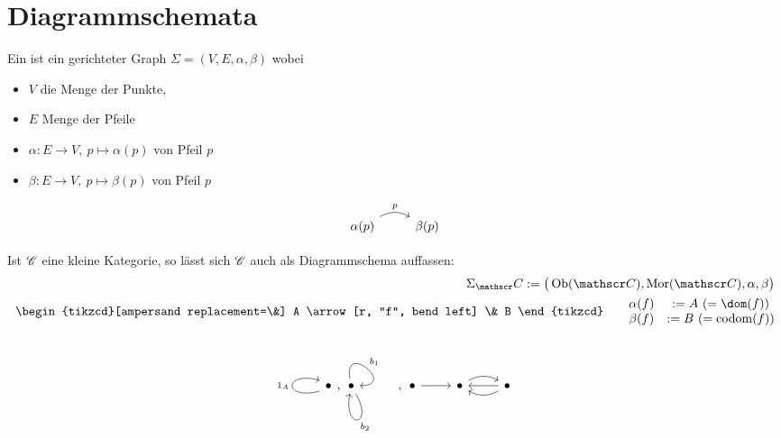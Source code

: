 \section{Diagrammschemata}
\begin{definition}\enter
	Ein  ist ein gerichteter Graph $\Sigma=(V,E,\alpha,\beta)$ wobei 
	\begin{itemize}
		\item $V$ die Menge der Punkte,
		\item $E$ Menge der Pfeile
		\item $\alpha:E\to V,~p\mapsto\alpha(p)$  von Pfeil $p$
		\item $\beta:E\to V,~p\mapsto\beta(p)$  von Pfeil $p$
	\end{itemize}
	$$
	\begin{tikzcd}
\alpha(p) \arrow[r, "p", bend left] & \beta(p)
\end{tikzcd}
$$
\end{definition}
Ist $\mathscr C$ eine kleine Kategorie, so lässt sich $\mathscr C$ auch als Diagrammschema auffassen:
\begin{align*}
	\Sigma_\Cat:=\big(\Ob(\Cat),\Mor(\Cat),\alpha,\beta\big)\\
		\begin{tikzcd}[ampersand replacement=\&]
A \arrow[r, "f", bend left] \& B
\end{tikzcd}\qquad\begin{matrix}
	\alpha(f)& :=A~(=\dom(f))\\
	\beta(f)&:=B~(=\codom(f))
\end{matrix}
\end{align*}

\begin{beisp} %
	$$\begin{tikzcd} 
	\arrow[loop left, distance=3em, start anchor={[yshift=-1ex]west}, end anchor={[yshift=1ex]west}]{}{1_A} \bullet 
	\end{tikzcd},
	\begin{tikzcd}
	\bullet \arrow[out=100, in=0, loop, distance=3em, "b_1"] \arrow[out=300, in=260, loop, distance=3em, "b_2"]
	\end{tikzcd},
	\begin{tikzcd}
	\bullet \arrow[r] & \bullet \arrow[r, bend left] & \bullet \arrow[l] \arrow[l, bend left]
	\end{tikzcd}$$
\end{beisp}

